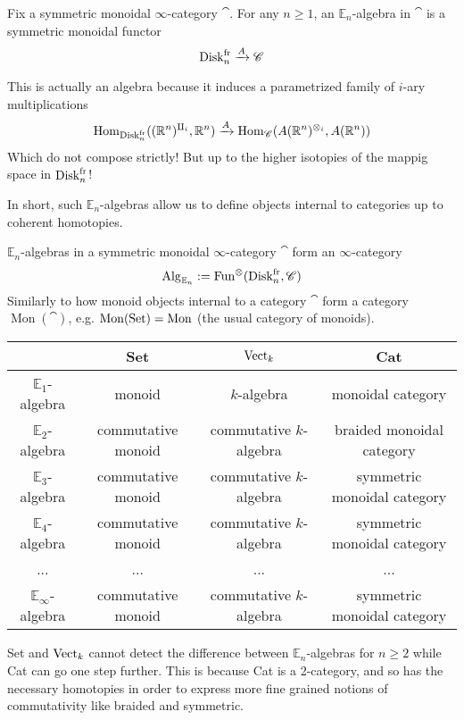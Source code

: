 \begin{defn}
    Fix a symmetric monoidal $\infty$-category $\cat$. For any
    $n\geq 1$, an $\mathbb{E}_n$-algebra in $\cat$ is a symmetric monoidal
    functor 
    $$\operatorname{Disk}_{n}^{\operatorname{fr}}\xrightarrow{A} \mathscr{C}$$
    
    This is actually an algebra because it induces a parametrized family of $i$-ary multiplications 
    $$\operatorname{Hom}_{\operatorname{Disk}_{n}^{\operatorname{fr}}}((\mathbb{R}^{n})^{\amalg_{i}},\mathbb{R}^n)\xrightarrow{A}\operatorname{Hom}_{\mathscr{C}}(A(\mathbb{R}^n)^{\otimes_{i}},A(\mathbb{R}^n))$$
    Which do not compose strictly! But up to the higher isotopies of the mappig space in $\operatorname{Disk}_{n}^{\operatorname{fr}}$!
\end{defn}

In short, such $\mathbb{E}_n$-algebras allow us to define objects internal to categories up to coherent 
homotopies. 

$\mathbb{E}_n$-algebras in a symmetric monoidal $\infty$-category $\cat$ form an $\infty$-category 
$$\operatorname{Alg}_{\mathbb{E}_n}:=\operatorname{Fun}^{\otimes} (\operatorname{Disk}_{n}^{\operatorname{fr}},\mathscr{C})$$
Similarly to how monoid objects internal to a category $\cat$ form a category $\operatorname{Mon}(\cat)$, e.g. $\operatorname{Mon}(\operatorname{Set})=\operatorname{Mon}$ (the usual category of monoids).

\begin{center}
    \begin{tabular}{|c||c|c|c|}
        \hline
        \phantom{h} & Set & $\operatorname{Vect}_k$ & Cat \\ [0.5ex]
        \hline\hline
        $\mathbb{E}_1$-algebra & monoid & $k$-algebra & monoidal category  \\
        \hline
        $\mathbb{E}_2$-algebra & commutative monoid &  commutative $k$-algebra & braided monoidal category \\
        \hline 
        $\mathbb{E}_3$-algebra & commutative monoid &  commutative $k$-algebra & symmetric monoidal category \\
        \hline
        $\mathbb{E}_4$-algebra & commutative monoid &  commutative $k$-algebra & symmetric monoidal category \\
        \hline 
        ... & ... & ... & ... \\
        \hline 
        $\mathbb{E}_\infty$-algebra & commutative monoid &  commutative $k$-algebra & symmetric monoidal category \\
        \hline
    \end{tabular}
\end{center}
Set and $\operatorname{Vect}_{k}$ cannot detect the difference between $\mathbb{E}_n$-algebras for $n\geq 2$ while 
Cat can go one step further. This is because Cat is a 2-category, and so has the necessary homotopies 
in order to express more fine grained notions of commutativity like braided and symmetric.

